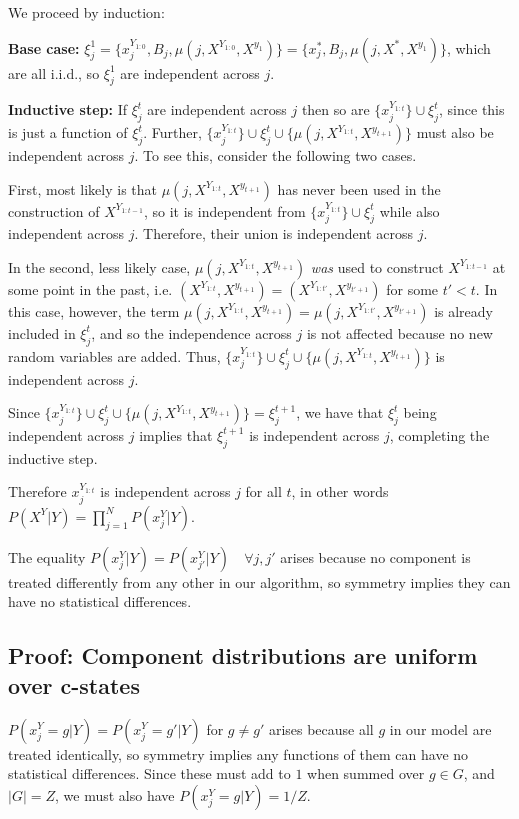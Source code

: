 \documentclass{article}
\begin{document}
We proceed by induction:

\textbf{Base case:} $\xi^1_j = \{x^{Y_{1:0}}_j, B_j, \mu(j, X^{Y_{1:0}}, X^{y_1})\} = \{x^*_j, B_j, \mu(j, X^*, X^{y_1})\}$, which are all i.i.d., so $\xi^1_j$ are independent across $j$.

\textbf{Inductive step:} If $\xi^t_j$ are independent across $j$ then so are $\{x_j^{Y_{1:t}}\} \cup \xi^t_j$, since this is just a function of $\xi^t_j$. Further, $\{x_j^{Y_{1:t}}\} \cup \xi^t_j \cup \{\mu(j, X^{Y_{1:t}}, X^{y_{t+1}})\}$ must also be independent across $j$. To see this, consider the following two cases.

First, most likely is that $\mu(j, X^{Y_{1:t}}, X^{y_{t+1}})$ has never been used in the construction of $X^{Y_{1:t-1}}$, so it is independent from $\{x_j^{Y_{1:t}}\} \cup \xi^t_j$ while also independent across $j$. Therefore, their union is independent across $j$.

In the second, less likely case, $\mu(j, X^{Y_{1:t}}, X^{y_{t+1}})$ \textit{was} used to construct $X^{Y_{1:t-1}}$ at some point in the past, i.e. $(X^{Y_{1:t}}, X^{y_{t+1}}) = (X^{Y_{1:t'}}, X^{y_{t'+1}})$ for some $t' < t$. In this case, however, the term $\mu(j, X^{Y_{1:t}}, X^{y_{t+1}}) = \mu(j, X^{Y_{1:t'}}, X^{y_{t'+1}})$ is already included in $\xi^t_j$, and so the independence across $j$ is not affected because no new random variables are added. Thus, $\{x_j^{Y_{1:t}}\} \cup \xi^t_j \cup \{\mu(j, X^{Y_{1:t}}, X^{y_{t+1}})\}$ is independent across $j$.

Since $\{x_j^{Y_{1:t}}\} \cup \xi^t_j \cup \{\mu(j, X^{Y_{1:t}}, X^{y_{t+1}})\} = \xi^{t+1}_j$, we have that $\xi^t_j$ being independent across $j$ implies that $\xi^{t+1}_j$ is independent across $j$, completing the inductive step.

Therefore $x_j^{Y_{1:t}}$ is independent across $j$ for all $t$, in other words $P(X^Y|Y) = \prod\limits_{j=1}^N P(x^Y_j|Y)$.

The equality $P(x^Y_j|Y) = P(x^Y_{j'}|Y) \quad \forall j, j'$ arises because no component is treated differently from any other in our algorithm, so symmetry implies they can have no statistical differences.

\subsection{Proof: Component distributions are uniform over c-states}

$P(x^Y_j = g|Y) = P(x^Y_j = g'|Y)$ for $g \neq g'$ arises because all $g$ in our model are treated identically, so symmetry implies any functions of them can have no statistical differences. Since these must add to $1$ when summed over $g \in G$, and $|G| = Z$, we must also have $P(x^Y_j = g|Y) = 1/Z.$
\end{document}
